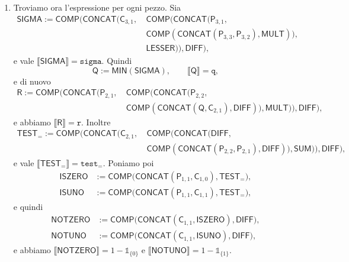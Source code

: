 \begin{sol}
\begin{enumerate}
Questa funzione è ricorsiva, infatti sia
\[
\texttt{eta}\colon\mathbb N^2\to\mathbb N,\qquad
(x,i)\longmapsto
\begin{cases}
0 & \text{se } [x]_{i+2}=0 \text{ oppure } x=1,\\
1 & \text{altrimenti,}
\end{cases}
\]
e abbiamo $\texttt{f}(x)=\min(\texttt{eta})(x)+2$.

Ora, per $x\ge2$, $x$ è primo se e solo se $\texttt{f}(x)=x$, e quindi
\[
\texttt{tau}(x):=\texttt{test}_{=}\big(\texttt{f}(x),x\big).
\]
In conclusione
\[
\mathbb 1_X=(1-\mathbb 1_{\{0\}})(1-\mathbb 1_{\{1\}})\cdot\texttt{tau}.
\]

\item Troviamo ora l'espressione per ogni pezzo. Sia
\[
\begin{aligned}
\mathsf{SIGMA}:=\mathsf{COMP}\Big(\mathsf{CONCAT}\big(\mathsf C_{3,1},\ &\mathsf{COMP}\big(\mathsf{CONCAT}\big(\mathsf P_{3,1},\\
&\mathsf{COMP}(\mathsf{CONCAT}(\mathsf P_{3,3},\mathsf P_{3,2}),\mathsf{MULT})\big),\\
&\mathsf{LESSER}\big)\big),\mathsf{DIFF}\Big),
\end{aligned}
\]
e vale $\llbracket\mathsf{SIGMA}\rrbracket=\texttt{sigma}$. Quindi
\[
\mathsf Q:=\mathsf{MIN}(\mathsf{SIGMA}),\qquad \llbracket\mathsf Q\rrbracket=\texttt{q},
\]
e di nuovo
\[
\begin{aligned}
\mathsf R:=\mathsf{COMP}\Big(\mathsf{CONCAT}\big(\mathsf P_{2,1},\ &\mathsf{COMP}\big(\mathsf{CONCAT}\big(\mathsf P_{2,2},\\
&\mathsf{COMP}(\mathsf{CONCAT}(\mathsf Q,\mathsf C_{2,1}),\mathsf{DIFF})\big),\mathsf{MULT}\big)\big),\mathsf{DIFF}\Big),
\end{aligned}
\]
e abbiamo $\llbracket\mathsf R\rrbracket=\texttt{r}$. Inoltre
\[
\begin{aligned}
\mathsf{TEST}_{=}:=\mathsf{COMP}\Big(\mathsf{CONCAT}\big(\mathsf C_{2,1},\ &\mathsf{COMP}\big(\mathsf{CONCAT}\big(\mathsf{DIFF},\\
&\mathsf{COMP}(\mathsf{CONCAT}(\mathsf P_{2,2},\mathsf P_{2,1}),\mathsf{DIFF})\big),\mathsf{SUM}\big)\big),\mathsf{DIFF}\Big),
\end{aligned}
\]
e vale $\llbracket\mathsf{TEST}_{=}\rrbracket=\texttt{test}_{=}$. Poniamo poi
\[
\begin{aligned}
\mathsf{ISZERO}&:=\mathsf{COMP}\big(\mathsf{CONCAT}(\mathsf P_{1,1},\mathsf C_{1,0}),\mathsf{TEST}_{=}\big),\\
\mathsf{ISUNO}&:=\mathsf{COMP}\big(\mathsf{CONCAT}(\mathsf P_{1,1},\mathsf C_{1,1}),\mathsf{TEST}_{=}\big),
\end{aligned}
\]
e quindi
\[
\begin{aligned}
\mathsf{NOTZERO}&:=\mathsf{COMP}\big(\mathsf{CONCAT}(\mathsf C_{1,1},\mathsf{ISZERO}),\mathsf{DIFF}\big),\\
\mathsf{NOTUNO}&:=\mathsf{COMP}\big(\mathsf{CONCAT}(\mathsf C_{1,1},\mathsf{ISUNO}),\mathsf{DIFF}\big),
\end{aligned}
\]
e abbiamo $\llbracket\mathsf{NOTZERO}\rrbracket=1-\mathbb 1_{\{0\}}$ e $\llbracket\mathsf{NOTUNO}\rrbracket=1-\mathbb 1_{\{1\}}$.


\end{enumerate}
\end{sol}
